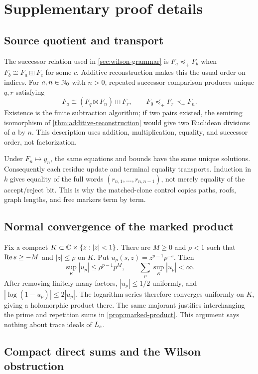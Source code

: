 \section{Supplementary proof details}
\label{app:proof-details}

\subsection{Source quotient and transport}

The successor relation used in \cref{sec:wilson-grammar} is
$F_a\preceq_+F_b$ when $F_b\cong F_a\boxplus F_c$ for some $c$.  Additive
reconstruction makes this the usual order on indices.  For $a,n\in\mathbb N_0$
with $n>0$, repeated successor comparison produces unique $q,r$ satisfying
\[
  F_a\cong(F_q\boxtimes F_n)\boxplus F_r,
  \qquad F_0\preceq_+F_r\prec_+F_n.
\]
Existence is the finite subtraction algorithm; if two pairs existed, the
semiring isomorphism of \cref{thm:additive-reconstruction} would give two
Euclidean divisions of $a$ by $n$.  This description uses addition,
multiplication, equality, and successor order, not factorization.

Under $F_n\mapsto y_n$, the same equations and bounds have the same unique
solutions.  Consequently each residue update and terminal equality
transports.  Induction in $k$ gives equality of the full words
$(r_{n,1},\ldots,r_{n,n-1})$, not merely equality of the accept/reject bit.
This is why the matched-clone control copies paths, roofs, graph lengths, and
free markers term by term.

\subsection{Normal convergence of the marked product}

Fix a compact $K\subset\mathbb C\times\{z:|z|<1\}$.  There are $M\geq0$ and
$\rho<1$ such that $\operatorname{Re} s\geq-M$ and $|z|\leq\rho$ on $K$.  Put
$u_p(s,z)=z^{p-1}p^{-s}$.  Then
\[
  \sup_K|u_p|\leq\rho^{p-1}p^M,
  \qquad
  \sum_p\sup_K|u_p|<\infty.
\]
After removing finitely many factors, $|u_p|\leq1/2$ uniformly, and
$|\log(1-u_p)|\leq2|u_p|$.  The logarithm series therefore converges uniformly
on $K$, giving a holomorphic product there.  The same majorant justifies
interchanging the prime and repetition sums in
\cref{prop:marked-product}.  This argument says nothing about trace ideals of
$L_s$.

\subsection{Compact direct sums and the Wilson obstruction}

